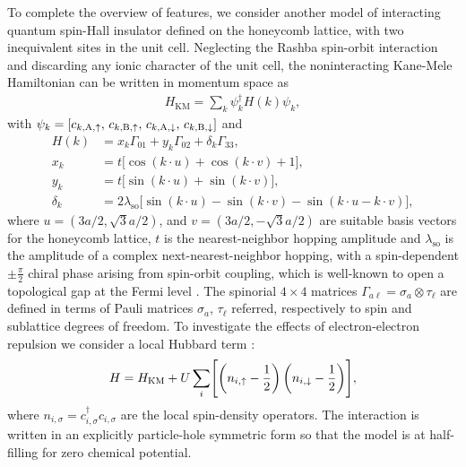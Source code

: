 \documentclass[edipack_sp.tex]{subfiles}
\begin{document}
To complete the overview of \NAME features, we consider another
model of interacting quantum spin-Hall insulator defined on the honeycomb lattice, with two inequivalent sites in the unit cell. Neglecting the Rashba spin-orbit interaction and discarding any ionic character of the unit cell, the noninteracting Kane-Mele Hamiltonian \cite{Kane2005PRLa,Kane2005PRL} can be written in momentum space as
\begin{align*}
    H_\mathrm{KM} = \sum_{{k}} \psi^\dagger_{{k}} H({k}) \psi_{{k}},
\end{align*}
with $\psi_{{k}} = [c_{{k},\mathrm{A},\uparrow},\,c_{{k},\mathrm{B},\uparrow},\,c_{{k},\mathrm{A},\downarrow},\,c_{{k},\mathrm{B},\downarrow}]$ and
    \begin{align}
    H({k}) 
    &= x_{{k}}\Gamma_{01} + y_{{k}}\Gamma_{02} + \delta_{{k}}\Gamma_{33}, \label{eq:Hk_kanemele}\\[1mm]
   x_{{k}}&=t\bigl[\cos({k}\cdot{u})+\cos({k}\cdot{v})+1\bigr],\nonumber\\
   y_{{k}}&=t\bigl[\sin({k}\cdot{u})+\sin({k}\cdot{v})\bigr],\nonumber \\
   \delta_{{k}}&=2\lambda_\mathrm{so}\bigl[\sin({k}\cdot{u})-\sin({k}\cdot{v}) - \sin({k}\cdot{u} -{k}\cdot{v})\bigr], \nonumber
\end{align}
where ${u} = (3a/2, \sqrt{3}a/2)$, and ${v} = (3a/2, -\sqrt{3}a/2)$ 
are suitable basis vectors for the honeycomb lattice, $t$ is the
nearest-neighbor hopping amplitude and $\lambda_\mathrm{so}$ is 
the amplitude of a complex next-nearest-neighbor hopping,
with a spin-dependent $\pm\tfrac{\pi}{2}$ chiral phase arising from spin-orbit coupling, which is well-known to open a topological gap at the Fermi level \cite{Kane2005PRLa,Kane2005PRL}.
The spinorial $4\times4$ matrices $\Gamma_{a\ell} = \sigma_a\otimes\tau_\ell$ are 
defined in terms of Pauli matrices $\sigma_a$, $\tau_\ell$ referred, respectively 
to spin and sublattice degrees of freedom.
To investigate the effects of electron-electron repulsion we consider a local Hubbard term \cite{Hohenadler2013ROPIP,Rachel2018ROPIP}:
\begin{equation}
    H = H_\mathrm{KM} 
    + U\sum_{i}\Biggl[
                        \left(n_{i,\uparrow} - \frac{1}{2}\right)
                        \left(n_{i,\downarrow} - \frac{1}{2}\right)
                      \Biggr],
    \label{eq:KMHmodel}
\end{equation}
where $n_{i,\sigma}=c^\dagger_{i,\sigma}c_{i,\sigma}$ are the 
local spin-density operators. The interaction is written in an explicitly 
particle-hole symmetric form so that the model is at half-filling for zero
chemical potential.
\end{document}
